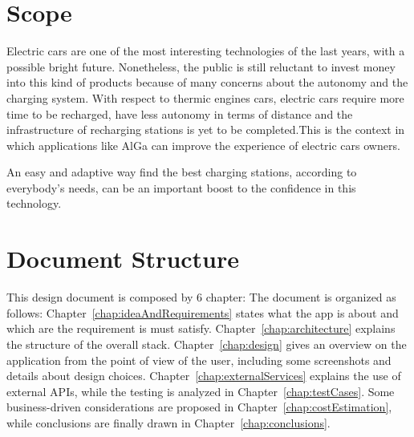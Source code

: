 \section{Scope}
Electric cars are one of the most interesting technologies of the last years, with a possible bright future. Nonetheless, the public is still reluctant to invest money into this kind of products because of many concerns about the autonomy and the charging system.
With respect to thermic engines cars, electric cars require more time to be recharged, have less autonomy in terms of distance and the infrastructure of recharging stations is yet to be completed.This is the context in which applications like AlGa can improve the experience of electric cars owners.

An easy and adaptive way find the best charging stations, according to everybody's needs, can be an important boost to the confidence in this technology. 

\section{Document Structure}
This design document is composed by 6 chapter:
The document is organized as follows: Chapter~\ref{chap:ideaAndRequirements} states what the app is about and which are the requirement is must satisfy. Chapter~\ref{chap:architecture} explains the structure of the overall stack. Chapter~\ref{chap:design} gives an overview on the application from the point of view of the user, including some screenshots and details about design choices. Chapter~\ref{chap:externalServices} explains the use of external APIs, while the testing is analyzed in Chapter~\ref{chap:testCases}. Some business-driven considerations are proposed in Chapter~\ref{chap:costEstimation}, while conclusions are finally drawn in Chapter~\ref{chap:conclusions}.

